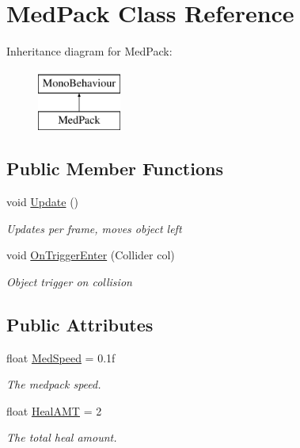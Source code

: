 \hypertarget{classMedPack}{\section{Med\-Pack Class Reference}
\label{classMedPack}
}
Inheritance diagram for Med\-Pack\-:\begin{figure}[H]
\begin{center}
\leavevmode
\includegraphics[height=2.000000cm]{classMedPack}
\end{center}
\end{figure}
\subsection*{Public Member Functions}
\begin{DoxyCompactItemize}
\item 
void \hyperlink{classMedPack_ab62bb43788d62cadf3177f763ee14820}{Update} ()
\begin{DoxyCompactList}\small\item\em Updates per frame, moves object left \end{DoxyCompactList}\item 
void \hyperlink{classMedPack_ae69e19d12dce004d6974e23aed815e7f}{On\-Trigger\-Enter} (Collider col)
\begin{DoxyCompactList}\small\item\em Object trigger on collision \end{DoxyCompactList}\end{DoxyCompactItemize}
\subsection*{Public Attributes}
\begin{DoxyCompactItemize}
\item 
float \hyperlink{classMedPack_a054a06495e6562f93eaeefed24d1d474}{Med\-Speed} = 0.\-1f
\begin{DoxyCompactList}\small\item\em The medpack speed. \end{DoxyCompactList}\item 
float \hyperlink{classMedPack_a7d896451dc580637510d0d345db611da}{Heal\-A\-M\-T} = 2
\begin{DoxyCompactList}\small\item\em The total heal amount. \end{DoxyCompactList}\end{DoxyCompactItemize}


